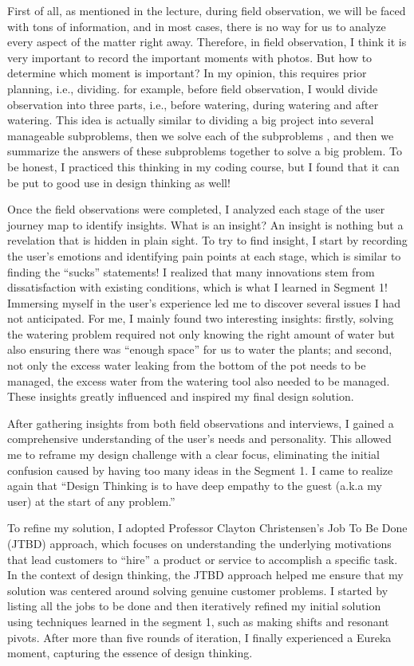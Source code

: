 \documentclass[math,code]{amznotes}
\theoremstyle{remark}
\begin{document}
First of all, as mentioned in the lecture, during field observation, we will be faced with tons of information, and in most cases, there is no way for us to analyze every aspect of the matter right away. Therefore, in field observation, I think it is very important to record the important moments with photos. But how to determine which moment is important? In my opinion, this requires prior planning, i.e., dividing. for example, before field observation, I would divide observation into three parts, i.e., before watering, during watering and after watering. This idea is actually similar to dividing a big project into several manageable subproblems, then we solve each of the subproblems , and then we summarize the answers of these subproblems together to solve a big problem. To be honest, I practiced this thinking in my coding course, but I found that it can be put to good use in design thinking as well!

Once the field observations were completed, I analyzed each stage of the user journey map to identify insights. What is an insight? An insight is nothing but a revelation that is hidden in plain sight. To try to find insight, I start by recording the user’s emotions and identifying pain points at each stage, which is similar to finding the ``sucks'' statements! I realized that many innovations stem from dissatisfaction with existing conditions, which is what I learned in Segment 1! Immersing myself in the user’s experience led me to discover several issues I had not anticipated. For me, I mainly found two interesting insights: firstly, solving the watering problem required not only knowing the right amount of water but also ensuring there was ``enough space'' for us to water the plants; and second, not only the excess water leaking from the bottom of the pot needs to be managed, the excess water from the watering tool also needed to be managed. These insights greatly influenced and inspired my final design solution.

After gathering insights from both field observations and interviews, I gained a comprehensive understanding of the user’s needs and personality. This allowed me to reframe my design challenge with a clear focus, eliminating the initial confusion caused by having too many ideas in the Segment 1. I came to realize again that ``Design Thinking is to have deep empathy to the guest (a.k.a my user) at the start of any problem.''

To refine my solution, I adopted Professor Clayton Christensen’s Job To Be Done (JTBD) approach, which focuses on understanding the underlying motivations that lead customers to ``hire'' a product or service to accomplish a specific task. In the context of design thinking, the JTBD approach helped me ensure that my solution was centered around solving genuine customer problems. I started by listing all the jobs to be done and then iteratively refined my initial solution using techniques learned in the segment 1, such as making shifts and resonant pivots. After more than five rounds of iteration, I finally experienced a Eureka moment, capturing the essence of design thinking.
\end{document}
